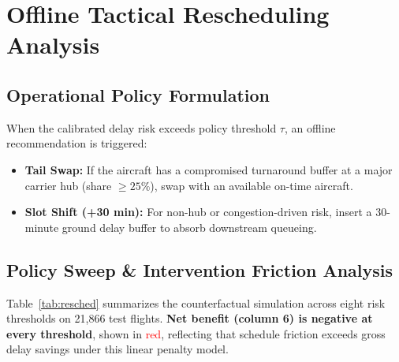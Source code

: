 \documentclass[conference]{IEEEtran}
\begin{document}
\section{Offline Tactical Rescheduling Analysis}
\subsection{Operational Policy Formulation}
When the calibrated delay risk exceeds policy threshold $\tau$, an offline recommendation is triggered:
\begin{itemize}
    \item \textbf{Tail Swap:} If the aircraft has a compromised turnaround buffer at a major carrier hub (share $\ge 25\%$), swap with an available on-time aircraft.
    \item \textbf{Slot Shift (+30 min):} For non-hub or congestion-driven risk, insert a 30-minute ground delay buffer to absorb downstream queueing.
\end{itemize}

\subsection{Policy Sweep \& Intervention Friction Analysis}
Table~\ref{tab:resched} summarizes the counterfactual simulation across eight risk thresholds on 21,866 test flights. \textbf{Net benefit (column 6) is negative at every threshold}, shown in \textcolor{red}{red}, reflecting that schedule friction exceeds gross delay savings under this linear penalty model.
\end{document}
